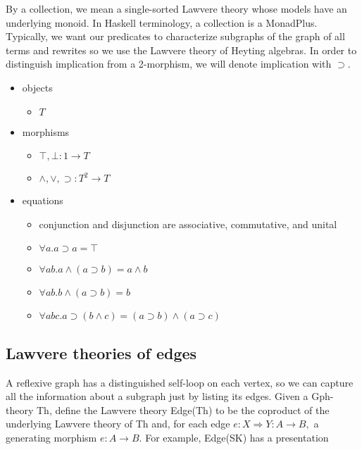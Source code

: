 \documentclass[a4paper,UKenglish]{article}
\newcommand{\maps}{\colon}
\begin{document}
By a collection, we mean a single-sorted Lawvere theory whose models have an underlying monoid.  In Haskell terminology, a collection is a MonadPlus.  Typically, we want our predicates to characterize subgraphs of the graph of all terms and rewrites so we use the Lawvere theory of Heyting algebras.  In order to distinguish implication from a 2-morphism, we will denote implication with $\supset.$
\begin{itemize}
  \item objects
    \begin{itemize}
      \item $T$
    \end{itemize}
  \item morphisms
    \begin{itemize}
      \item $\top, \bot\maps 1 \to T$
      \item $\land, \lor, \supset\maps T^2 \to T$
    \end{itemize}
  \item equations
    \begin{itemize}
      \item conjunction and disjunction are associative, commutative, and unital
      \item $\forall a.a \supset a = \top$
      \item $\forall ab.a \land (a \supset b) = a \land b$
      \item $\forall ab.b \land (a \supset b) = b$
      \item $\forall abc.a \supset (b \land c) = (a \supset b) \land (a \supset c)$
    \end{itemize}
\end{itemize}

\subsection{Lawvere theories of edges}

A reflexive graph has a distinguished self-loop on each vertex, so we can capture all the information about a subgraph just by listing its edges.  Given a Gph-theory Th, define the Lawvere theory Edge(Th) to be the coproduct of the underlying Lawvere theory of Th and, for each edge $e\maps X \Rightarrow Y \maps A \to B,$ a generating morphism $e\maps A \to B.$  For example, Edge(SK) has a presentation
\end{document}
